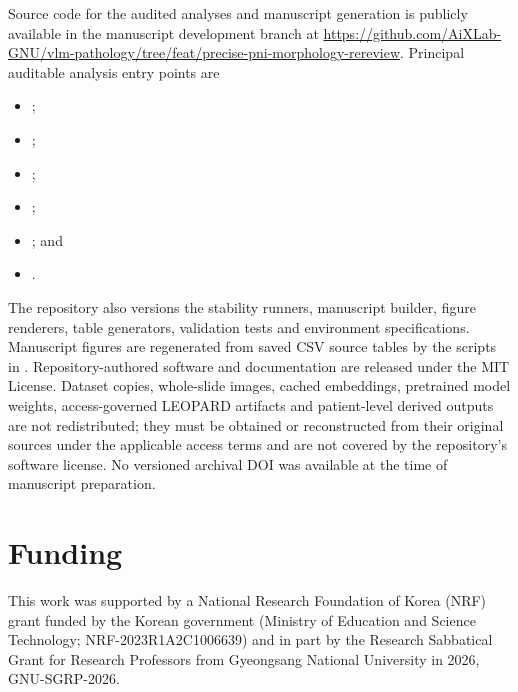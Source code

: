 Source code for the audited analyses and manuscript generation is publicly available in
the manuscript development branch at
\url{https://github.com/AiXLab-GNU/vlm-pathology/tree/feat/precise-pni-morphology-rereview}.
Principal auditable analysis entry points are
\begin{itemize}
\item {};
\item {};
\item {};
\item {};
\item {}; and
\item {}.
\end{itemize}
The repository also versions the stability runners, manuscript builder, figure renderers,
table generators, validation tests and environment specifications. Manuscript figures are
regenerated from saved CSV source tables by the scripts in .
Repository-authored software and documentation are released under the MIT License.
Dataset copies, whole-slide images, cached embeddings, pretrained model weights,
access-governed LEOPARD artifacts and patient-level derived outputs are not redistributed;
they must be obtained or reconstructed from their original sources under the applicable
access terms and are not covered by the repository's software license. No versioned archival
DOI was available at the time of manuscript preparation.

\section*{Funding}

This work was supported by a National Research Foundation of Korea (NRF) grant funded by
the Korean government (Ministry of Education and Science Technology;
NRF-2023R1A2C1006639) and in part by the Research Sabbatical Grant
for Research Professors from Gyeongsang National University in 2026, GNU-SGRP-2026.

